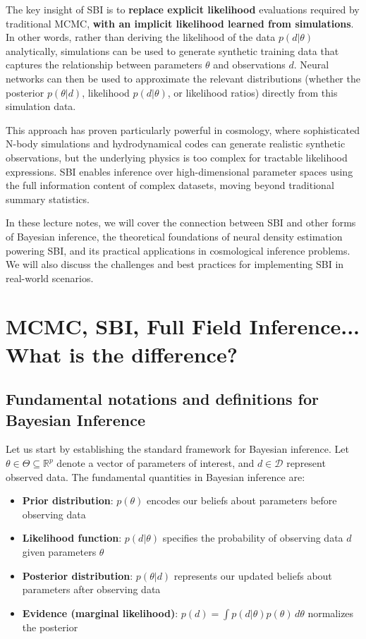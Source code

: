 \documentclass{SciPost}
\begin{document}
The key insight of SBI is to \textbf{replace explicit likelihood} evaluations required by traditional MCMC, \textbf{with an implicit likelihood learned from simulations}. In other words, rather than deriving the likelihood of the data $p(d|\theta)$ analytically, simulations can be used to generate synthetic training data that captures the relationship between parameters $\theta$ and observations $d$. Neural networks can then be used to approximate the relevant distributions (whether the posterior $p(\theta|d)$, likelihood $p(d|\theta)$, or likelihood ratios) directly from this simulation data.

This approach has proven particularly powerful in cosmology, where sophisticated N-body simulations and hydrodynamical codes can generate realistic synthetic observations, but the underlying physics is too complex for tractable likelihood expressions. SBI enables inference over high-dimensional parameter spaces using the full information content of complex datasets, moving beyond traditional summary statistics.

In these lecture notes, we will cover the connection between SBI and other forms of Bayesian inference, the theoretical foundations of neural density estimation powering SBI, and its practical applications in cosmological inference problems. We will also discuss the challenges and best practices for implementing SBI in real-world scenarios.


\section{MCMC, SBI, Full Field Inference... What is the difference?}

\subsection{Fundamental notations and definitions for Bayesian Inference}

Let us start by establishing the standard framework for Bayesian inference. Let $\theta \in \Theta \subseteq \mathbb{R}^p$ denote a vector of parameters of interest, and $d \in \mathcal{D}$ represent observed data. The fundamental quantities in Bayesian inference are:

\begin{itemize}
    \item \textbf{Prior distribution}: $p(\theta)$ encodes our beliefs about parameters before observing data
    \item \textbf{Likelihood function}: $p(d|\theta)$ specifies the probability of observing data $d$ given parameters $\theta$
    \item \textbf{Posterior distribution}: $p(\theta|d)$ represents our updated beliefs about parameters after observing data
    \item \textbf{Evidence (marginal likelihood)}: $p(d) = \int p(d|\theta)p(\theta) \, d\theta$ normalizes the posterior
\end{itemize}
\end{document}
